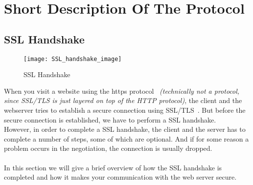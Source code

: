 \section{Short Description Of The Protocol} %

\subsection{SSL Handshake}
\begin{wrapfigure}{R}{0.4\textwidth}
	\vspace{-30pt}
  \begin{center}
\texttt{[image: SSL\_handshake\_image]}
  \end{center}
	\vspace{-20pt}
  \caption{SSL Handshake}
\end{wrapfigure}
When you visit a website using the https protocol~\cite{wikipediaHTTPS} \textit{(technically not a protocol, since SSL/TLS is just layered on top of the HTTP protocol)}, the client and the webserver tries to establish a secure connection using SSL/TLS~\cite{wikipediaSSLTLS}. But before the secure connection is established, we have to perform a SSL handshake.\\ 
However, in order to complete a SSL handshake, the client and the server has to complete a number of steps, some of which are optional. And if for some reason a problem occurs in the negotiation, the connection is usually dropped.\\\\
In this section we will give a brief overview of how the SSL handshake is completed and how it makes your communication with the web server secure.

